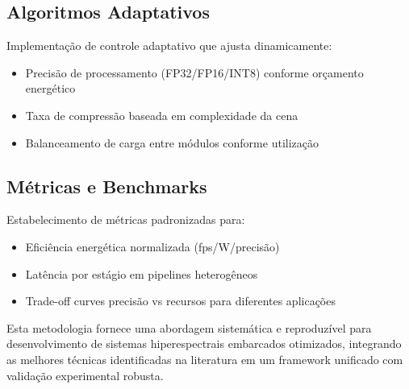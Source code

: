 \subsection{Algoritmos Adaptativos}

Implementação de controle adaptativo que ajusta dinamicamente:
\begin{itemize}
\item Precisão de processamento (FP32/FP16/INT8) conforme orçamento energético
\item Taxa de compressão baseada em complexidade da cena
\item Balanceamento de carga entre módulos conforme utilização
\end{itemize}

\subsection{Métricas e Benchmarks}

Estabelecimento de métricas padronizadas para:
\begin{itemize}
\item Eficiência energética normalizada (fps/W/precisão)
\item Latência por estágio em pipelines heterogêneos
\item Trade-off curves precisão vs recursos para diferentes aplicações
\end{itemize}

Esta metodologia fornece uma abordagem sistemática e reproduzível para desenvolvimento de sistemas hiperespectrais embarcados otimizados, integrando as melhores técnicas identificadas na literatura em um framework unificado com validação experimental robusta.